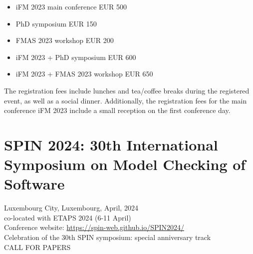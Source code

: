 \documentclass[prodmode,acmtecs]{acmsmall} %
\begin{document}
\begin{itemize}
\begin{itemize}\item  iFM 2023 main conference        EUR 500
\item  PhD symposium                   EUR 150
\item  FMAS 2023 workshop              EUR 200
\item  iFM 2023 + PhD symposium        EUR 600
\item  iFM 2023 + FMAS 2023 workshop   EUR 650
\end{itemize} 
  The registration fees include lunches and tea/coffee breaks during the registered event, as well as a social dinner. Additionally, the registration fees for the main conference iFM 2023 include a small reception on the first conference day.  
 
\end{itemize}\section{SPIN 2024: 30th International Symposium on Model Checking of Software}\label{SPIN2024}  Luxembourg City, Luxembourg, April, 2024\\ 
  co-located with ETAPS 2024 (6-11 April)\\ 
  Conference website: \href{https://spin-web.github.io/SPIN2024/}{https://spin-web.github.io/SPIN2024/}\\ 
  Celebration of the 30th SPIN symposium: special anniversary track\\ 
CALL FOR PAPERS 
\end{document}
